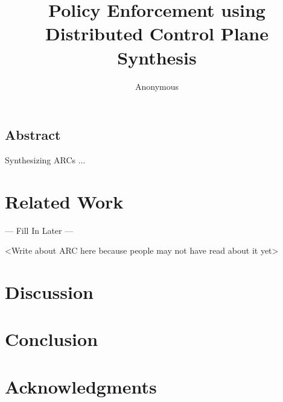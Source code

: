 \documentclass{hotnets16}
\begin{document}
 {}
\date{}


\title{Policy Enforcement using \\ Distributed Control Plane Synthesis}

\author{Anonymous}

\maketitle


\subsection*{Abstract}

Synthesizing ARCs ...



\section{Related Work}
--- Fill In Later ---

<Write about ARC here because people may not have read about it yet>




\section{Discussion}

\section{Conclusion}

\section*{Acknowledgments}

 
\begin{small}

\end{small}
\label{last-page}
\end{document}
